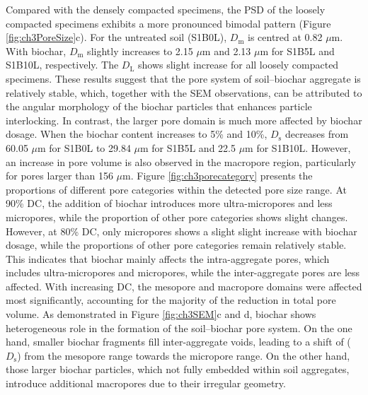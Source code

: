 Compared with the densely compacted specimens, the \ac{PSD} of the loosely compacted specimens exhibits a more pronounced bimodal pattern (Figure \ref{fig:ch3PoreSize}c). For the untreated soil (S1B0L), $D_{\mathrm{m}}$ is centred at 0.82 $\mu$m. With biochar, $D_{\mathrm{m}}$ slightly increases to 2.15 $\mu$m and 2.13 $\mu$m for S1B5L and S1B10L, respectively. The $D_{\mathrm{L}}$ shows slight increase for all loosely compacted specimens. These results suggest that the pore system of soil–biochar aggregate is relatively stable, which, together with the SEM observations, can be attributed to the angular morphology of the biochar particles that enhances particle interlocking. In contrast, the larger pore domain is much more affected by biochar dosage. When the biochar content increases to 5\% and 10\%, $D_{\mathrm{s}}$ decreases from 60.05 $\mu$m for S1B0L to 29.84 $\mu$m for S1B5L and 22.5 $\mu$m for S1B10L. However, an increase in pore volume is also observed in the macropore region, particularly for pores larger than 156 $\mu$m. Figure \ref{fig:ch3porecategory} presents the proportions of different pore categories within the detected pore size range. At 90\% \ac{DC}, the addition of biochar introduces more ultra-micropores and less micropores, while the proportion of other pore categories shows slight changes. However, at 80\% \ac{DC}, only micropores shows a slight slight increase with biochar dosage, while the proportions of other pore categories remain relatively stable. This indicates that biochar mainly affects the intra-aggregate pores, which includes ultra-micropores and micropores, while the inter-aggregate pores are less affected. With increasing \ac{DC}, the mesopore and macropore domains were affected most significantly, accounting for the majority of the reduction in total pore volume. As demonstrated in Figure \ref{fig:ch3SEM}c and d, biochar shows heterogeneous role in the formation of the soil–biochar pore system. On the one hand, smaller biochar fragments fill inter-aggregate voids, leading to a shift of ($D_{\mathrm{s}}$) from the mesopore range towards the micropore range. On the other hand, those larger biochar particles, which not fully embedded within soil aggregates, introduce additional macropores due to their irregular geometry.\par

